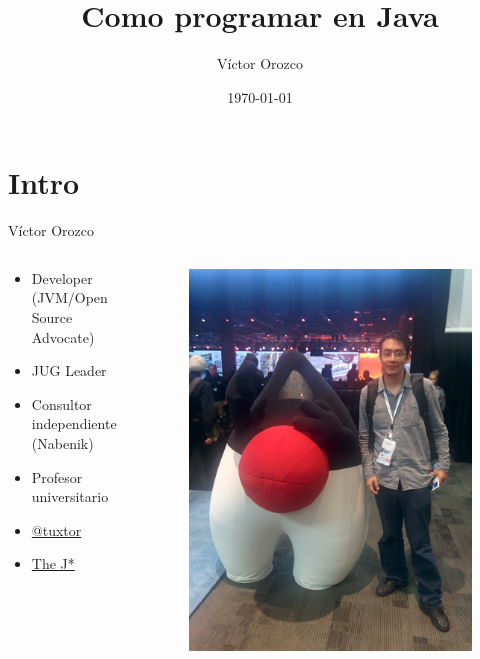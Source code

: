\documentclass{beamer}
\title{Como programar en Java}
\author{Víctor Orozco}
\institute{Nabenik}
\date{\today}
\begin{document}
\frame{\titlepage}

\section{Intro}


\begin{frame}{Víctor Orozco}
     \begin{columns}[T] %
	     \begin{column}[T]{5cm} %
				\begin{itemize}
				\item Developer (JVM/Open Source Advocate)
				\item JUG Leader
				\item Consultor independiente (Nabenik)
				\item Profesor universitario
				\item \href{https://twitter.com/tuxtor}{@tuxtor}
				\item \href{http://vorozco.com}{The J*} 
				\end{itemize}
	     \end{column}
	     \begin{column}[T]{5cm} %
			\begin{figure}
			\centering
			\includegraphics[width=0.7\linewidth]{Images/j1.jpg}
			\end{figure}

	     \end{column}
     \end{columns}
\end{frame}
\end{document}
